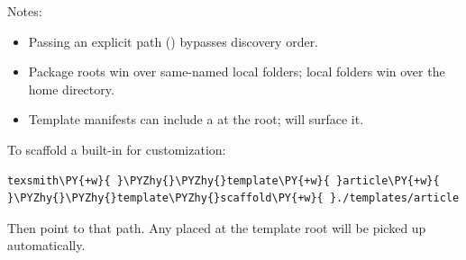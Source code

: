 \documentclass[a4paper,twoside]{article}
\begin{document}
Notes:
\begin{itemize}
\item Passing an explicit path () bypasses discovery order.
\item Package roots win over same-named local folders; local folders win over the home directory.
\item Template manifests can include a  at the root;  will surface it.
\end{itemize}
To scaffold a built-in for customization:
\begin{tscode}[lang=bash, engine=pygments]
\begin{Verbatim}[commandchars=\\\{\},breaklines, breakanywhere, commandchars=\\\{\}]
texsmith\PY{+w}{ }\PYZhy{}\PYZhy{}template\PY{+w}{ }article\PY{+w}{ }\PYZhy{}\PYZhy{}template\PYZhy{}scaffold\PY{+w}{ }./templates/article
\end{Verbatim}
\end{tscode}
Then point  to that path. Any  placed at the template root will be picked up automatically.
\end{document}

